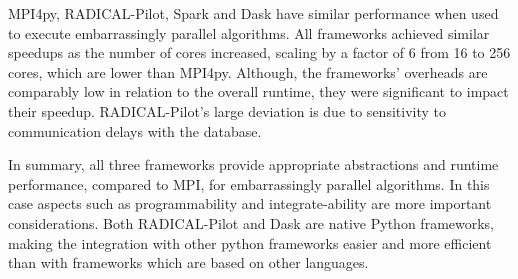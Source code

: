 MPI4py, RADICAL-Pilot, Spark and Dask have similar performance when used to execute embarrassingly parallel algorithms.
All frameworks achieved similar speedups as the number of cores increased, scaling by a factor of 6 from 16 to 256 cores, which are lower than MPI4py.
Although, the frameworks' overheads are comparably low in relation to the overall runtime, they were significant to impact their speedup.
RADICAL-Pilot's large deviation is due to sensitivity to communication delays with the database.

In summary, all three frameworks provide appropriate abstractions and runtime performance, compared to MPI, for embarrassingly parallel algorithms. 
In this case aspects such as programmability and integrate-ability are more important considerations.
Both RADICAL-Pilot and Dask are native Python frameworks, making the integration with other python frameworks easier and more efficient than with frameworks which are based on other languages.



